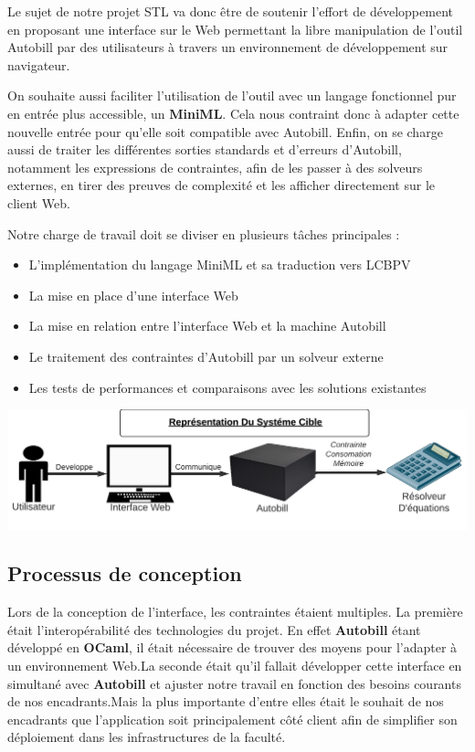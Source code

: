 \documentclass[
  12pt,
]{article}
\providecommand{\tightlist}{%
  \setlength{\itemsep}{0pt}\setlength{\parskip}{0pt}}
\begin{document}
Le sujet de notre projet STL va donc être de soutenir l'effort de
développement en proposant une interface sur le Web permettant la libre
manipulation de l'outil Autobill par des utilisateurs à travers un
environnement de développement sur navigateur.

On souhaite aussi faciliter l'utilisation de l'outil avec un langage
fonctionnel pur en entrée plus accessible, un \textbf{MiniML}. Cela nous
contraint donc à adapter cette nouvelle entrée pour qu'elle soit
compatible avec Autobill. Enfin, on se charge aussi de traiter les
différentes sorties standards et d'erreurs d'Autobill, notamment les
expressions de contraintes, afin de les passer à des solveurs externes,
en tirer des preuves de complexité et les afficher directement sur le
client Web.

Notre charge de travail doit se diviser en plusieurs tâches principales
:

\begin{itemize}
\tightlist
\item
  L'implémentation du langage MiniML et sa traduction vers LCBPV
\item
  La mise en place d'une interface Web
\item
  La mise en relation entre l'interface Web et la machine Autobill
\item
  Le traitement des contraintes d'Autobill par un solveur externe
\item
  Les tests de performances et comparaisons avec les solutions
  existantes
\end{itemize}

\includegraphics{./MarkdownVersions/Rapport/Diagramme Haut Niveau PSTL.png}

\hypertarget{processus-de-conception}{%
\subsection{Processus de conception}\label{processus-de-conception}}

Lors de la conception de l'interface, les contraintes étaient multiples.
La première était l'interopérabilité des technologies du projet. En
effet \textbf{Autobill} étant développé en \textbf{OCaml}, il était
nécessaire de trouver des moyens pour l'adapter à un environnement
Web.La seconde était qu'il fallait développer cette interface en
simultané avec \textbf{Autobill} et ajuster notre travail en fonction
des besoins courants de nos encadrants.Mais la plus importante d'entre
elles était le souhait de nos encadrants que l'application soit
principalement côté client afin de simplifier son déploiement dans les
infrastructures de la faculté.
\end{document}
